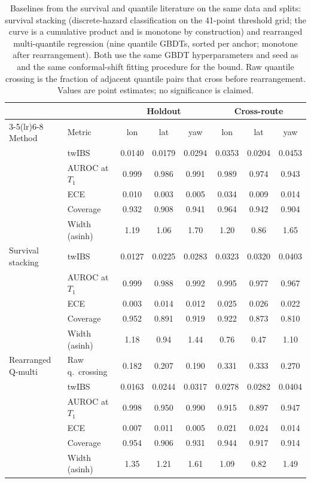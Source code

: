 \begin{table}[!t]
\caption{Baselines from the survival and quantile literature on the same data and splits: survival stacking (discrete-hazard classification on the 41-point threshold grid; the curve is a cumulative product and is monotone by construction) and rearranged multi-quantile regression (nine quantile GBDTs, sorted per anchor; monotone after rearrangement). Both use the same GBDT hyperparameters and seed as \meld{} and the same conformal-shift fitting procedure for the bound. Raw quantile crossing is the fraction of adjacent quantile pairs that cross before rearrangement. Values are point estimates; no significance is claimed.}
\label{tab:litbase}
\centering
\footnotesize
\setlength{\tabcolsep}{6pt}
\begin{tabular}{llcccccc}
\toprule
 & & \multicolumn{3}{c}{Holdout} & \multicolumn{3}{c}{Cross-route} \\
\cmidrule(lr){3-5}\cmidrule(lr){6-8}
Method & Metric & lon & lat & yaw & lon & lat & yaw \\
\midrule
\meld{} & twIBS & 0.0140 & 0.0179 & 0.0294 & 0.0353 & 0.0204 & 0.0453 \\
 & AUROC at $T_1$ & 0.999 & 0.986 & 0.991 & 0.989 & 0.974 & 0.943 \\
 & ECE & 0.010 & 0.003 & 0.005 & 0.034 & 0.009 & 0.014 \\
 & Coverage & 0.932 & 0.908 & 0.941 & 0.964 & 0.942 & 0.904 \\
 & Width (asinh) & 1.19 & 1.06 & 1.70 & 1.20 & 0.86 & 1.65 \\
\midrule
Survival stacking & twIBS & 0.0127 & 0.0225 & 0.0283 & 0.0323 & 0.0320 & 0.0403 \\
 & AUROC at $T_1$ & 0.999 & 0.988 & 0.992 & 0.995 & 0.977 & 0.967 \\
 & ECE & 0.003 & 0.014 & 0.012 & 0.025 & 0.026 & 0.022 \\
 & Coverage & 0.952 & 0.891 & 0.919 & 0.922 & 0.873 & 0.810 \\
 & Width (asinh) & 1.18 & 0.94 & 1.44 & 0.76 & 0.47 & 1.10 \\
\midrule
Rearranged Q-multi & Raw q.\ crossing & 0.182 & 0.207 & 0.190 & 0.331 & 0.333 & 0.270 \\
 & twIBS & 0.0163 & 0.0244 & 0.0317 & 0.0278 & 0.0282 & 0.0404 \\
 & AUROC at $T_1$ & 0.998 & 0.950 & 0.990 & 0.915 & 0.897 & 0.947 \\
 & ECE & 0.007 & 0.011 & 0.005 & 0.021 & 0.024 & 0.014 \\
 & Coverage & 0.954 & 0.906 & 0.931 & 0.944 & 0.917 & 0.914 \\
 & Width (asinh) & 1.35 & 1.21 & 1.61 & 1.09 & 0.82 & 1.49 \\
\bottomrule
\end{tabular}
\end{table}
